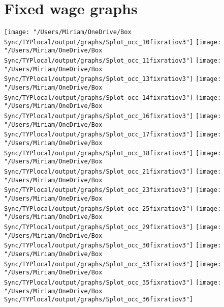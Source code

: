 \documentclass[11pt]{article}
\begin{document}
\section{Fixed wage graphs}
\texttt{[image: "/Users/Miriam/OneDrive/Box Sync/TYPlocal/output/graphs/Splot\_occ\_10fixratiov3"]}
\newline
\texttt{[image: "/Users/Miriam/OneDrive/Box Sync/TYPlocal/output/graphs/Splot\_occ\_11fixratiov3"]}
\newline
\texttt{[image: "/Users/Miriam/OneDrive/Box Sync/TYPlocal/output/graphs/Splot\_occ\_13fixratiov3"]}
\newline
\texttt{[image: "/Users/Miriam/OneDrive/Box Sync/TYPlocal/output/graphs/Splot\_occ\_14fixratiov3"]}
\newline
\texttt{[image: "/Users/Miriam/OneDrive/Box Sync/TYPlocal/output/graphs/Splot\_occ\_16fixratiov3"]}
\newline
\texttt{[image: "/Users/Miriam/OneDrive/Box Sync/TYPlocal/output/graphs/Splot\_occ\_17fixratiov3"]}
\newline
\texttt{[image: "/Users/Miriam/OneDrive/Box Sync/TYPlocal/output/graphs/Splot\_occ\_18fixratiov3"]}
\newline
\texttt{[image: "/Users/Miriam/OneDrive/Box Sync/TYPlocal/output/graphs/Splot\_occ\_21fixratiov3"]}
\newline
\texttt{[image: "/Users/Miriam/OneDrive/Box Sync/TYPlocal/output/graphs/Splot\_occ\_23fixratiov3"]}
\newline
\texttt{[image: "/Users/Miriam/OneDrive/Box Sync/TYPlocal/output/graphs/Splot\_occ\_25fixratiov3"]}
\newline
\texttt{[image: "/Users/Miriam/OneDrive/Box Sync/TYPlocal/output/graphs/Splot\_occ\_29fixratiov3"]}
\newline
\texttt{[image: "/Users/Miriam/OneDrive/Box Sync/TYPlocal/output/graphs/Splot\_occ\_30fixratiov3"]}
\newline
\texttt{[image: "/Users/Miriam/OneDrive/Box Sync/TYPlocal/output/graphs/Splot\_occ\_33fixratiov3"]}
\newline
\texttt{[image: "/Users/Miriam/OneDrive/Box Sync/TYPlocal/output/graphs/Splot\_occ\_35fixratiov3"]}
\newline
\texttt{[image: "/Users/Miriam/OneDrive/Box Sync/TYPlocal/output/graphs/Splot\_occ\_36fixratiov3"]}
\end{document}

